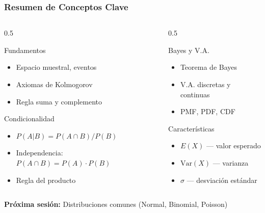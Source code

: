 \documentclass[aspectratio=169,11pt]{beamer}
\begin{document}
\begin{frame}[fragile]
\frametitle{Resumen de Conceptos Clave}

\small

\begin{columns}[T]
\begin{column}{0.5\textwidth}
\begin{block}{Fundamentos}
\begin{itemize}
  \item Espacio muestral, eventos
  \item Axiomas de Kolmogorov
  \item Regla suma y complemento
\end{itemize}
\end{block}

\begin{block}{Condicionalidad}
\begin{itemize}
  \item $P(A|B) = P(A \cap B) / P(B)$
  \item Independencia: $P(A \cap B) = P(A) \cdot P(B)$
  \item Regla del producto
\end{itemize}
\end{block}
\end{column}

\begin{column}{0.5\textwidth}
\begin{block}{Bayes y V.A.}
\begin{itemize}
  \item Teorema de Bayes
  \item V.A. discretas y continuas
  \item PMF, PDF, CDF
\end{itemize}
\end{block}

\begin{block}{Características}
\begin{itemize}
  \item $E(X)$ — valor esperado
  \item $\text{Var}(X)$ — varianza
  \item $\sigma$ — desviación estándar
\end{itemize}
\end{block}
\end{column}
\end{columns}

\pause
\vspace{0.2cm}
\centering
\normalsize \textbf{Próxima sesión:} Distribuciones comunes (Normal, Binomial, Poisson)
\end{frame}
\end{document}
